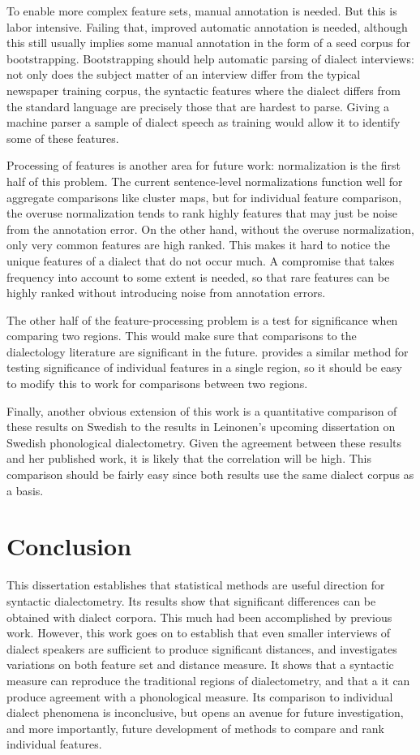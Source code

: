 To enable more complex feature sets, manual annotation is needed. But
this is labor intensive. Failing that, improved automatic annotation
is needed, although this still usually implies some manual annotation
in the form of a seed corpus for bootstrapping. Bootstrapping should
help automatic parsing of dialect interviews: not only does the
subject matter of an interview differ from the typical newspaper
training corpus, the syntactic features where the dialect differs from
the standard language are precisely those that are hardest to
parse. Giving a machine parser a sample of dialect speech as training
would allow it to identify some of these features.

Processing of features is another area for future work: normalization
is the first half of this problem. The current sentence-level
normalizations function well for aggregate comparisons like cluster
maps, but for individual feature comparison, the overuse normalization
tends to rank highly features that may just be noise from the
annotation error. On the other hand, without the overuse
normalization, only very common features are high ranked. This makes
it hard to notice the unique features of a dialect that do not occur
much. A compromise that takes frequency into account to some extent is
needed, so that rare features can be highly ranked without introducing
noise from annotation errors.

The other half of the feature-processing problem is a test for
significance when comparing two regions. This would make sure that
comparisons to the dialectology literature are significant in the
future.  provides a similar method for testing
significance of individual features in a single region, so it should
be easy to modify this to work for comparisons between two regions.

Finally, another obvious extension of this work is a quantitative
comparison of these results on Swedish to the results in Leinonen's
upcoming dissertation on Swedish phonological dialectometry. Given the
agreement between these results and her published work, it is likely
that the correlation will be high. This comparison should be fairly
easy since both results use the same dialect corpus as a basis.

\section{Conclusion}

This dissertation establishes that statistical methods are useful
direction for syntactic dialectometry. Its results show that
significant differences can be obtained with dialect corpora. This
much had been accomplished by previous work. However, this work goes
on to establish that even smaller interviews of dialect speakers are
sufficient to produce significant distances, and investigates
variations on both feature set and distance measure. It shows that a
syntactic measure can reproduce the traditional regions of
dialectometry, and that a it can produce agreement with a phonological
measure. Its comparison to individual dialect phenomena is
inconclusive, but opens an avenue for future investigation, and more
importantly, future development of methods to compare and rank
individual features.

